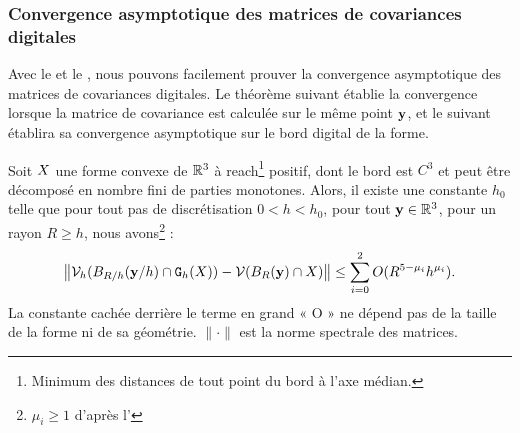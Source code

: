 \subsubsection{Convergence asymptotique des matrices de covariances digitales}
%
Avec le  et le
, nous pouvons facilement prouver la
convergence asymptotique des matrices de covariances digitales. Le théorème
suivant établie la convergence lorsque la matrice de covariance est calculée sur
le même point $\mathbf{y}$, et le suivant établira sa convergence asymptotique sur le
bord digital de la forme.
%
\begin{theorem}{}
  \label{thm:conv-cov-matrix}
%
  Soit $X$ une forme convexe de $\mathbb{R}^3$ à reach\footnote{Minimum des
  distances de tout point du bord à l'axe médian.} positif, dont le bord est
  $C^3$ et peut être décomposé en nombre fini de parties monotones. Alors, il
  existe une constante $h_0$ telle que pour tout pas de discrétisation $0 < h <
  h_0$, pour tout $\mathbf{y} \in \mathbb{R}^3$, pour un rayon $R \ge h$, nous
  avons\footnote{$\mu_i \ge 1$ d'après
  l'} :
%
  \begin{equation}
    \left \| \mathcal{V}_{h}( B_{R/h}(\mathbf{y}/h) \cap  \mathtt{G}_{h}(X) ) - \mathcal{V}( B_{R}(\mathbf{y}) \cap X )\right \| \le \sum_{i=0}^2 O(R^{5-\mu_i}h^{\mu_i}).
  \end{equation}
%
  La constante cachée derrière le terme en grand « O » ne dépend pas de la
  taille de la forme ni de sa géométrie. $\|\cdot\|$ est la norme spectrale des
  matrices.
%
\end{theorem}
